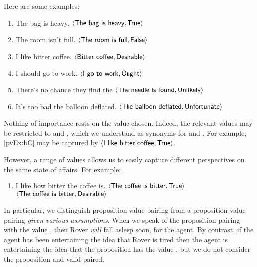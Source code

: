 \begin{note}
  Here are some examples:

  \begin{enumerate}[label=\arabic*., ref=(\arabic*),noitemsep, series=propValExC]
  \item
    The bag is heavy.%
    \hfill%
    \(\pv{\prop{The bag is heavy}}{\val{True}}\)
  \item
    The room isn't full.%
    \hfill%
    \(\pv{\prop{The room is full}}{\val{False}}\)
  \item
    \label{pvEx:bC}
    I like bitter coffee.%
    \hfill%
    \(\pv{\prop{Bitter coffee}}{\val{Desirable}}\)
  \item
    I should go to work.%
    \hfill%
    \(\pv{\prop{I go to work}}{\val{Ought}}\)
  \item
    There's no chance they find the%
    \hfill%
    \(\pv{\prop{The needle is found}}{\val{Unlikely}}\)
  \item
    It's too bad the balloon deflated.%
    \hfill%
    \(\pv{\prop{The balloon deflated}}{\val{Unfortunate}}\)
  \end{enumerate}

  Nothing of importance rests on the value chosen.
  Indeed, the relevant values may be restricted to  and , which we understand as synonyms for  and .
  For example, \ref{pvEx:bC} may be captured by \(\pv{\prop{I like bitter coffee}}{\val{True}}\).

  However, a range of values allows us to easily capture different perspectives on the same state of affairs.
  For example:
  \begin{enumerate}[label=\arabic*., ref=(\arabic*),noitemsep, resume*=propValExC]
  \item I like how bitter the coffee is.%
    \hfill%
    \(\pv{\prop{The coffee is bitter}}{\val{True}}\)\newline
    \hfill%
    \(\pv{\prop{The coffee is bitter}}{\val{Desirable}}\)
  \end{enumerate}
\end{note}

\begin{note}
  In particular, we distinguish proposition-value pairing from a proposition-value pairing \emph{given various assumptions}.
  When we speak of the proposition  pairing with the value , then Rover \emph{will} fall asleep soon, for the agent.
  By contrast, if the agent has been entertaining the idea that Rover is tired then the agent is entertaining the idea that the proposition  has the value , but we do not consider the proposition and valid paired.
\end{note}

